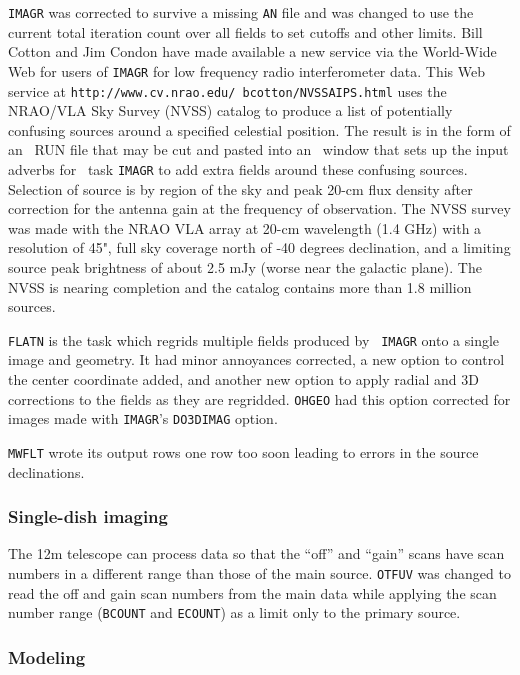 {\tt IMAGR} was corrected to survive a missing {\tt AN} file and was
changed to use the current total iteration count over all fields to
set cutoffs and other limits.  Bill Cotton and Jim Condon have made
available a new service via the World-Wide Web for users of
{\tt IMAGR} for low frequency radio interferometer data.  This Web
service at {\tt http://www.cv.nrao.edu/~bcotton/NVSSAIPS.html} uses
the NRAO/VLA Sky Survey (NVSS) catalog to produce a list of
potentially confusing sources around a specified celestial position.
The result is in the form of an \AIPS\ RUN file that may be cut and
pasted into an \AIPS\ window that sets up the input adverbs for \AIPS\
task {\tt IMAGR} to add extra fields around these confusing sources.
Selection of source is by region of the sky and peak 20-cm flux
density after correction for the antenna gain at the frequency of
observation.  The NVSS survey was made with the NRAO VLA array at
20-cm wavelength (1.4 GHz) with a resolution of 45", full sky coverage
north of -40 degrees declination, and a limiting source peak
brightness of about 2.5 mJy (worse near the galactic plane).  The NVSS
is nearing completion and the catalog contains more than 1.8 million
sources.

{\tt FLATN} is the task which regrids multiple fields produced by {\tt
IMAGR} onto a single image and geometry.  It had minor annoyances
corrected, a new option to control the center coordinate added, and
another new option to apply radial and 3D corrections to the fields as
they are regridded.  {\tt OHGEO} had this option corrected for images
made with {\tt IMAGR}'s {\tt DO3DIMAG} option.

{\tt MWFLT} wrote its output rows one row too soon leading to errors
in the source declinations.
\eject

\subsubsection{Single-dish imaging}

The 12m telescope can process data so that the ``off'' and ``gain''
scans have scan numbers in a different range than those of the main
source.  {\tt OTFUV} was changed to read the off and gain scan numbers
from the main data while applying the scan number range ({\tt BCOUNT}
and {\tt ECOUNT}) as a limit only to the primary source.

\subsubsection{Modeling}


